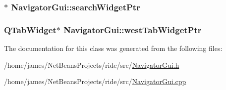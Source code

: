 \hypertarget{class_navigator_gui_a33531deedb97ceb340409fc4e5f8620e}{
\subsubsection[{search\-Widget\-Ptr}]{$\ast$ Navigator\-Gui\-::search\-Widget\-Ptr\hspace{0.3cm}{\ttfamily [private]}}}\label{class_navigator_gui_a33531deedb97ceb340409fc4e5f8620e}
\hypertarget{class_navigator_gui_aea3dc7b54a723ca369742ee6a0f34f03}{
\subsubsection[{west\-Tab\-Widget\-Ptr}]{\setlength{\rightskip}{0pt plus 5cm}Q\-Tab\-Widget$\ast$ Navigator\-Gui\-::west\-Tab\-Widget\-Ptr\hspace{0.3cm}{\ttfamily [private]}}}\label{class_navigator_gui_aea3dc7b54a723ca369742ee6a0f34f03}


The documentation for this class was generated from the following files\-:\begin{DoxyCompactItemize}
\item 
/home/james/\-Net\-Beans\-Projects/ride/src/\hyperlink{_navigator_gui_8h}{Navigator\-Gui.\-h}\item 
/home/james/\-Net\-Beans\-Projects/ride/src/\hyperlink{_navigator_gui_8cpp}{Navigator\-Gui.\-cpp}\end{DoxyCompactItemize}
